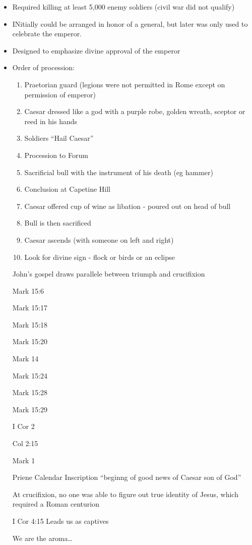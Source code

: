 \documentclass[
]{book}
\providecommand{\tightlist}{%
  \setlength{\itemsep}{0pt}\setlength{\parskip}{0pt}}
\begin{document}
\begin{itemize}
\item
  Required killing at least 5,000 enemy soldiers (civil war did not qualify)
\item
  INitially could be arranged in honor of a general, but later was only used to celebrate the emperor.
\item
  Designed to emphasize divine approval of the emperor
\item
  Order of procession:

  \begin{enumerate}
  \def\labelenumi{\arabic{enumi})}
  \tightlist
  \item
    Praetorian guard (legions were not permitted in Rome except on permission of emperor)
  \item
    Caesar dressed like a god with a purple robe, golden wreath, sceptor or reed in his hands
  \item
    Soldiers ``Hail Caesar''
  \item
    Procession to Forum
  \item
    Sacrificial bull with the instrument of his death (eg hammer)
  \item
    Conclusion at Capetine Hill
  \item
    Caesar offered cup of wine as libation - poured out on head of bull
  \item
    Bull is then sacrificed
  \item
    Caesar ascends (with someone on left and right)
  \item
    Look for divine sign - flock or birds or an eclipse
  \end{enumerate}

  John's gospel draws parallele between triumph and crucifixion

  Mark 15:6

  Mark 15:17

  Mark 15:18

  Mark 15:20

  Mark 14

  Mark 15:24

  Mark 15:28

  Mark 15:29

  I Cor 2

  Col 2:15

  Mark 1

  Priene Calendar Inscription ``beginng of good news of Caesar son of God''

  At crucifixion, no one was able to figure out true identity of Jesus, which required a Roman centurion

  I Cor 4:15 Leads us as captives

  We are the aroma\ldots{}
\end{itemize}
\end{document}
